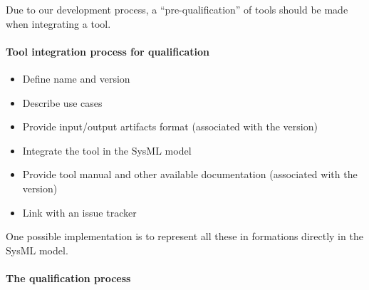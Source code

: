 \documentclass{openetcs_report}
\begin{document}
Due to our development process, a ``pre-qualification'' of tools should be made
when integrating a tool.

\paragraph{Tool integration process for qualification}

\begin{itemize}
\item Define name and version
\item Describe use cases
\item Provide input/output artifacts format (associated with the
  version)
\item Integrate the tool in the SysML model
\item Provide tool manual and other available documentation (associated with the version)
\item Link with an issue tracker
\end{itemize}

One possible implementation is to represent all these in formations
directly in the SysML model.

\paragraph{The qualification process}
\end{document}

